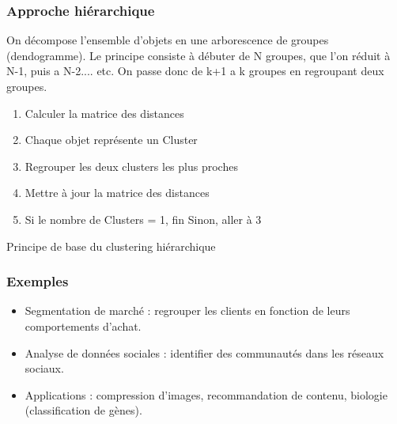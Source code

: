 \documentclass[a4paper,12pt]{report}
\begin{document}
        \subsubsection*{Approche hiérarchique}
        On décompose l'ensemble d'objets en une arborescence de groupes
        (dendogramme). Le principe consiste à débuter de N groupes, que l'on réduit à
        N-1, puis a N-2.... etc. On passe donc de k+1 a k groupes en regroupant deux
        groupes. 
        \\
        \begin{enumerate}[leftmargin=*]
            \item Calculer la matrice des distances
            \item Chaque objet représente un Cluster
            \item Regrouper les deux clusters les plus proches
            \item Mettre à jour la matrice des distances
            \item Si le nombre de Clusters = 1, fin Sinon, aller à 3
          \end{enumerate}
        
        Principe de base du clustering hiérarchique
        
        \subsubsection*{Exemples}

        
        \begin{itemize}
            \item  Segmentation de marché : regrouper les clients en fonction de leurs comportements d’achat.
            \item  Analyse de données sociales : identifier des communautés dans les réseaux sociaux.
            \item  Applications : compression d’images, recommandation de contenu, biologie (classification de gènes).
        \end{itemize}
        
        
      
\end{document}
